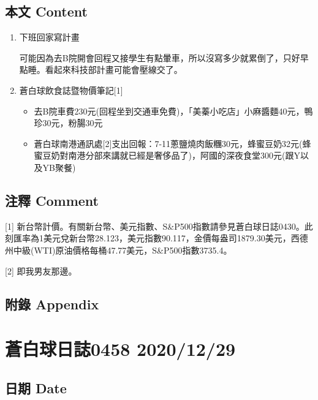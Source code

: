 \documentclass[a5paper, 10pt
]{book}
\providecommand{\tightlist}{%
  \setlength{\itemsep}{0pt}\setlength{\parskip}{0pt}}
\begin{document}
\hypertarget{ux672cux6587-content-27}{%
\subsection{本文 Content}\label{ux672cux6587-content-27}}

\begin{enumerate}
\def\labelenumi{\arabic{enumi}.}
\item
  下班回家寫計畫

  可能因為去B院開會回程又接學生有點暈車，所以沒寫多少就累倒了，只好早點睡。看起來科技部計畫可能會壓線交了。
\item
  蒼白球飲食誌暨物價筆記{[}1{]}

  \begin{itemize}
  \tightlist
  \item
    去B院車費230元(回程坐到交通車免費)，「美蓁小吃店」小麻醬麵40元，鴨珍30元，粉腸30元
  \item
    蒼白球南港通訊處{[}2{]}支出回報：7-11蔥鹽燒肉飯糰30元，蜂蜜豆奶32元(蜂蜜豆奶對南港分部來講就已經是奢侈品了)，阿國的深夜食堂300元(跟Y以及YB聚餐)
  \end{itemize}
\end{enumerate}

\hypertarget{ux6ce8ux91cb-comment-27}{%
\subsection{注釋 Comment}\label{ux6ce8ux91cb-comment-27}}

{[}1{]}
新台幣計價。有關新台幣、美元指數、S\&P500指數請參見蒼白球日誌0430。此刻匯率為1美元兌新台幣28.123，美元指數90.117，金價每盎司1879.30美元，西德州中級(WTI)原油價格每桶47.77美元，S\&P500指數3735.4。

{[}2{]} 即我男友那邊。

\hypertarget{ux9644ux9304-appendix-27}{%
\subsection{附錄 Appendix}\label{ux9644ux9304-appendix-27}}

\hypertarget{ux84bcux767dux7403ux65e5ux8a8c0458-20201229}{%
\section{蒼白球日誌0458
2020/12/29}\label{ux84bcux767dux7403ux65e5ux8a8c0458-20201229}}

\hypertarget{ux65e5ux671f-date-28}{%
\subsection{日期 Date}\label{ux65e5ux671f-date-28}}
\end{document}

